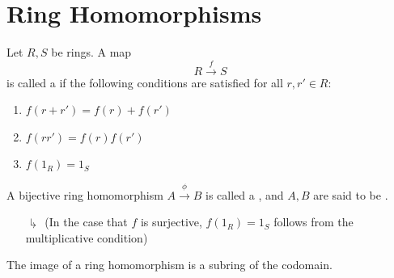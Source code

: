 \documentclass[12pt, a4paper, oneside, openright, titlepage]{book}
\begin{document}
\section{\textsection Ring Homomorphisms}

\begin{defn}
    Let $R,S$ be rings. A map $$R\xrightarrow{f}S$$
    is called a  if the following conditions are satisfied for all $r,r' \in R$:
    \begin{enumerate}
        \item $f(r+r') = f(r)+f(r')$
        \item $f(rr') = f(r)f(r')$
        \item $f(1_R) = 1_S$
    \end{enumerate}
    A bijective ring homomorphism $A\xrightarrow{\phi}B$ is called a , and $A, B$ are said to be .
    \begin{enumerate}
        \item[$\drsh$] (In the case that $f$ is surjective, $f(1_R) = 1_S$ follows from the multiplicative condition) 
    \end{enumerate}
\end{defn}

\begin{rmk}
    The image of a ring homomorphism is a subring of the codomain.
\end{rmk}
\end{document}
